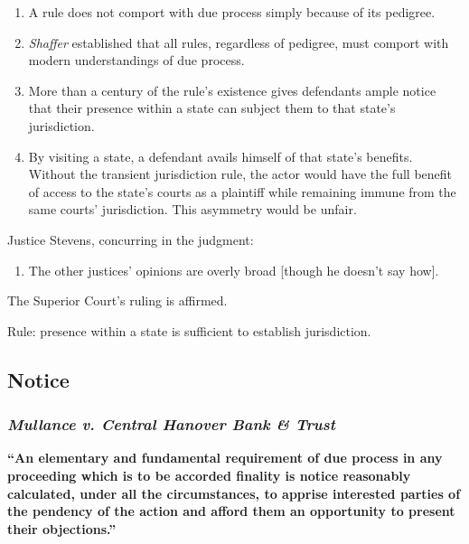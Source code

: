 \begin{enumerate}
\item
  A rule does not comport with due process simply because of its
  pedigree.
\item
  \emph{Shaffer} established that all rules, regardless of pedigree,
  must comport with modern understandings of due process.
\item
  More than a century of the rule's existence gives defendants ample
  notice that their presence within a state can subject them to that
  state's jurisdiction.
\item
  By visiting a state, a defendant avails himself of that state's
  benefits. Without the transient jurisdiction rule, the actor would
  have the full benefit of access to the state's courts as a plaintiff
  while remaining immune from the same courts' jurisdiction. This
  asymmetry would be unfair.
\end{enumerate}

Justice Stevens, concurring in the judgment:

\begin{enumerate}
\item
  The other justices' opinions are overly broad {[}though he doesn't say
  how{]}.
\end{enumerate}

The Superior Court's ruling is affirmed.

Rule: presence within a state is sufficient to establish jurisdiction.


\subsection{Notice}

\subsubsection{\emph{Mullance v. Central Hanover Bank \& Trust}}

\textbf{``An elementary and fundamental requirement of due process in any proceeding which is to be accorded finality is notice reasonably calculated, under all the circumstances, to apprise interested parties of the pendency of the action and afford them an opportunity to present their objections.''}

